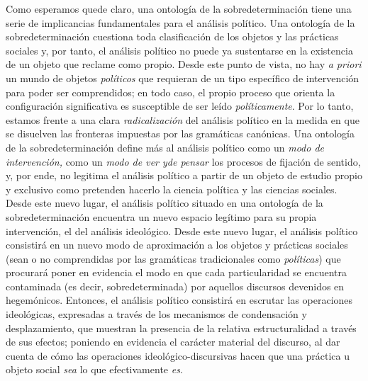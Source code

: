 Como esperamos quede claro, una ontología de la sobredeterminación tiene una serie de implicancias fundamentales para el análisis político. Una ontología de la sobredeterminación cuestiona toda clasificación de los objetos y las prácticas sociales y, por tanto, el análisis político no puede ya sustentarse en la existencia de un objeto que reclame como propio. Desde este punto de vista, no hay \emph{a priori} un mundo de objetos \emph{políticos} que requieran de un tipo específico de intervención para poder ser comprendidos; en todo caso, el propio proceso que orienta la configuración significativa es susceptible de ser leído \emph{políticamente}. Por lo tanto, estamos frente a una clara \emph{radicalización} del análisis político en la medida en que se disuelven las fronteras impuestas por las gramáticas canónicas. Una ontología de la sobredeterminación define más al análisis político como un \emph{modo de intervención,} como un \emph{modo de ver yde pensar} los procesos de fijación de sentido, y, por ende, no legitima el análisis político a partir de un objeto de estudio propio y exclusivo como pretenden hacerlo la ciencia política y las ciencias sociales. Desde este nuevo lugar, el análisis político situado en una ontología de la sobredeterminación encuentra un nuevo espacio legítimo para su propia intervención, el del análisis ideológico. Desde este nuevo lugar, el análisis político consistirá en un nuevo modo de aproximación a los objetos y prácticas sociales (sean o no comprendidas por las gramáticas tradicionales como \emph{políticas}) que procurará poner en evidencia el modo en que cada particularidad se encuentra contaminada (es decir, sobredeterminada) por aquellos discursos devenidos en hegemónicos. Entonces, el análisis político consistirá en escrutar las operaciones ideológicas, expresadas a través de los mecanismos de condensación y desplazamiento, que muestran la presencia de la relativa estructuralidad a través de sus efectos; poniendo en evidencia el carácter material del discurso, al dar cuenta de cómo las operaciones ideológico-discursivas hacen que una práctica u objeto social \emph{sea} lo que efectivamente \emph{es}.


